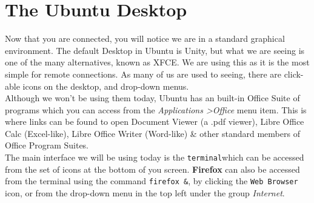 \section{The Ubuntu Desktop}
\begin{note}
Now that you are connected, you will notice we are in a standard graphical environment.
The default Desktop in Ubuntu is Unity, but what we are seeing is one of the many alternatives, known as XFCE.
We are using this as it is the most simple for remote connections.
As many of us are used to seeing, there are click-able icons on the desktop, and drop-down menus. \\

Although we won't be using them today, Ubuntu has an built-in Office Suite of
programs which you can access from the \textit{Applications \textgreater Office} menu item.
This is where links can be found to open Document Viewer (a .pdf viewer), Libre Office Calc (Excel-like), Libre Office Writer (Word-like) \& other standard members of Office Program Suites. \\

The main interface we will be using today is the \texttt{terminal}which can be accessed from the set of icons at the bottom of you screen.
\textbf{Firefox} can also be accessed from the terminal using the command \texttt{firefox \&},  by clicking the \texttt{Web Browser} icon, or from the drop-down menu in the top left under the group \textit{Internet}.

\end{note}
